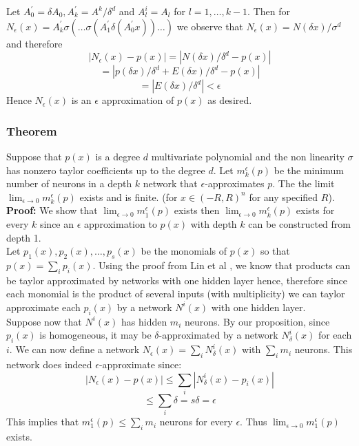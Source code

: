 \documentclass{article}
\begin{document}
Let $A_0^{'} = \delta A_0, A_k^{'} = A^{k} / \delta^d $ 
and $A_{l}^{i} = A_l$ for $l =1,\dots,k-1.$ Then for $N_{\epsilon}(x) = A_k^{'} \sigma(\dots \sigma(A_1^{'} \delta (A_0^{'} x)) \dots )$ we observe that $N_{\epsilon}(x) = N(\delta x)/\sigma^d$ and therefore 
$$|N_{\epsilon}(x) - p(x)| = |N(\delta x)/\delta^d -p(x)| $$
$$= |p(\delta x)/\delta^d + E(\delta x)/\delta^d - p(x)|$$
$$= |E(\delta x)/\delta^d|< \epsilon$$
Hence $N_{\epsilon}(x)$ is an $\epsilon$ approximation of $p(x)$ as desired.
\subsubsection{Theorem}
Suppose that $p(x)$ is a degree $d$ multivariate polynomial and the non linearity $\sigma$ has nonzero taylor coefficients up to the degree $d$. Let $m_k^{\epsilon}(p)$ be the minimum number of neurons in a depth $k$ network that $\epsilon$-approximates $p$. The the limit $\lim_{\epsilon \to 0} m_k^{\epsilon}(p)$ exists and is finite. (for $x \in (-R,R)^n$ for any specified $R$). \\
\textbf{Proof:} We show that $\lim_{\epsilon \to 0} m_1^{\epsilon} (p)$ exists then $\lim_{\epsilon \to 0} m_k^{\epsilon} (p)$ exists for every $k$ since an $\epsilon$ approximation to $p(x)$ with depth $k$ can be constructed from depth 1. 
\\Let $p_1(x),p_2(x),\dots,p_s(x)$ be the monomials of $p(x)$ so that $p(x) = \sum_i p_i(x)$. Using the proof from Lin et al \cite{lin2017},
we know that products can be taylor approximated by networks with one hidden layer hence, therefore since each monomial is the product of several inputs (with multiplicity) we can taylor approximate each $p_i(x)$ by a network $N^i(x)$ with one hidden layer. \\
Suppose now that $N^i(x)$ has hidden $m_i$ neurons. By our proposition, since $p_i(x)$ is homogeneous, it may be $\delta$-approximated by a network $N_{\delta}^i(x)$ for each $i$. We can now define a network $N_{\epsilon}(x) = \sum_{i} N_{\delta}^{i}(x)$ with $\sum_i m_i$ neurons. This network does indeed $\epsilon$-approximate since:
$$|N_{\epsilon}(x) - p(x)|\leq \sum_i |N_{\delta}^{i} (x) - p_i(x)|$$
$$\leq \sum_i \delta = s\delta = \epsilon$$
This implies that $m_1^{\epsilon} (p) \leq \sum_i m_i$ neurons for every $\epsilon$. Thus $\lim_{\epsilon \to 0} m_1^{\epsilon} (p)$ exists.\\
\end{document}
